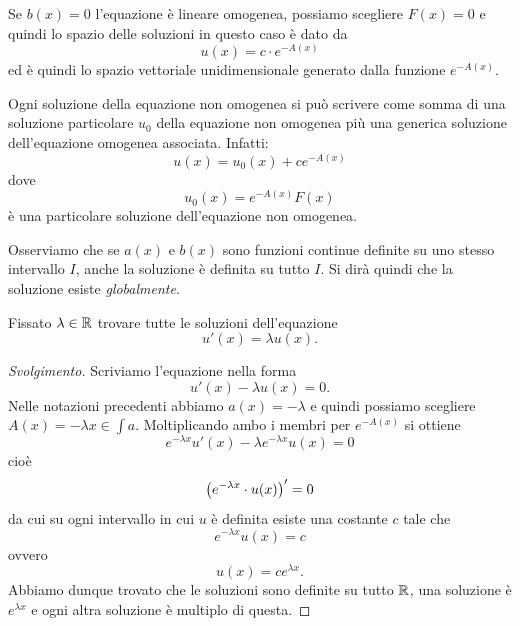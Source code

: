 Se $b(x)=0$ l'equazione è lineare omogenea, possiamo scegliere $F(x) = 0$
e quindi lo spazio delle soluzioni in questo caso
è dato da
\[
  u(x) = c \cdot e^{-A(x)}
\]
ed è quindi lo spazio vettoriale unidimensionale generato dalla funzione $e^{-A(x)}$.

Ogni soluzione della equazione non omogenea si può scrivere come somma di una
soluzione particolare $u_0$ della equazione non omogenea
più una generica soluzione dell'equazione omogenea associata. Infatti:
\[
  u(x) = u_0(x) + c e^{-A(x)}
\]
dove
\[
  u_0(x) = e^{-A(x)}F(x)
\]
è una particolare soluzione dell'equazione non omogenea.

Osserviamo che se $a(x)$ e $b(x)$ sono funzioni continue definite su uno stesso
intervallo $I$, anche la soluzione è definita su tutto $I$.
Si dirà quindi che la soluzione esiste \emph{globalmente}.

\begin{exercise}
Fissato $\lambda \in \mathbb R$ trovare tutte le soluzioni dell'equazione
\[
  u'(x) = \lambda u(x).
\]
\end{exercise}
%
\begin{proof}[Svolgimento]
Scriviamo l'equazione nella forma
\[
  u'(x) - \lambda u(x) = 0.
\]
Nelle notazioni precedenti abbiamo $a(x) = -\lambda$ e quindi possiamo scegliere $A(x) = -\lambda x \in \int a$.
Moltiplicando ambo i membri per $e^{-A(x)}$ si ottiene
\[
  e^{-\lambda x} u'(x) - \lambda e^{-\lambda x} u(x) = 0
\]
cioè
\[
 {\left( e^{-\lambda x}\cdot u(x) \right)}' = 0
\]
da cui su ogni intervallo in cui $u$ è definita esiste una costante $c$ tale che
\[
  e^{-\lambda x} u(x) = c
\]
ovvero
\[
  u(x) = c e^{\lambda x}.
\]
Abbiamo dunque trovato che le soluzioni sono definite su tutto $\mathbb R$, una soluzione è $e^{\lambda x}$ e ogni altra soluzione è multiplo di questa.
\end{proof}

